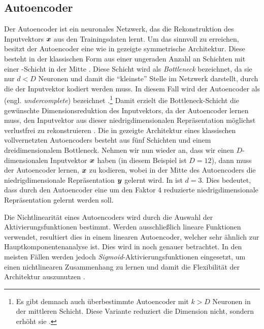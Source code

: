 \subsection{Autoencoder}
\label{ch:MethodenDerDimRed:ML:AE}

Der Autoencoder ist ein neuronales Netzwerk, das die Rekonstruktion des Inputvektors $\bm{x}$ aus
den Trainingsdaten lernt. Um das sinnvoll zu erreichen, besitzt der Autoencoder eine wie in
 gezeigte symmetrische Architektur. Diese besteht in der
klassischen Form aus einer ungeraden Anzahl an Schichten mit einer -Schicht in
der Mitte \parencite[2]{Bank.2020}. Diese Schicht wird als \textit{Bottleneck} bezeichnet, da sie nur $d < D$
Neuronen und damit die \enquote{kleinste} Stelle im Netzwerk darstellt, durch die der Inputvektor
kodiert werden muss. In diesem Fall wird der Autoencoder als  (engl.
\textit{undercomplete}) bezeichnet \parencite[503]{Goodfellow.2016}.\footnote{Es gibt demnach auch überbestimmte Autoencoder mit $k > D$
	Neuronen in der mittleren Schicht. Diese Variante reduziert die Dimension nicht, sondern erhöht sie \parencite[504]{Goodfellow.2016}.} Damit erzielt die Bottleneck-Schicht die gewünschte
Dimensionsreduktion des Inputvektors, da der Autoencoder lernen muss, den Inputvektor aus dieser
niedrigdimensionalen Repräsentation möglichst verlustfrei zu rekonstruieren \parencites[502]{Goodfellow.2016}[2]{Bank.2020}. Die in  gezeigte
Architektur eines klassischen vollvernetzten Autoencoders besteht aus fünf Schichten und einem
dreidimensionalem Bottleneck. Nehmen wir nun wieder an, dass wir einen $D$-dimensionalen
Inputvektor $\bm{x}$ haben (in diesem Beispiel ist $D = 12$), dann muss der Autoencoder lernen,
$\bm{x}$ zu kodieren, wobei in der Mitte des Autoencoders die niedrigdimensionale Repräsentation
$\bm{y}$ gelernt wird. In  ist $d = 3$. Dies bedeutet, dass
durch den Autoencoder eine um den Faktor 4 reduzierte niedrigdimensionale Repräsentation gelernt
werden soll.

Die Nichtlinearität eines Autoencoders wird durch die Auswahl der Aktivierungsfunktionen bestimmt.
Werden ausschließlich lineare Funktionen verwendet, resultiert dies in einem linearen Autoencoder,
welcher sehr ähnlich zur Hauptkomponentenanalyse ist. Dies wird in
 noch genauer betrachtet. In den meisten
Fällen werden jedoch \textit{Sigmoid}-Aktivierungsfunktionen eingesetzt, um einen nichtlinearen
Zusammenhang zu lernen und damit die Flexibilität der Architektur auszunutzen \parencite[4]{Charte.2018}.

